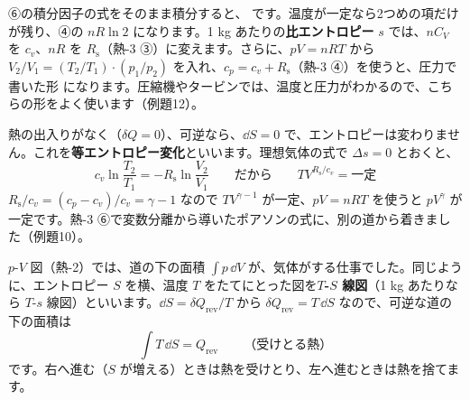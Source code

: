 ⑥の積分因子の式をそのまま積分すると、
です。温度が一定なら2つめの項だけが残り、④の $nR\ln2$ になります。1 kg あたりの\textbf{比エントロピー} $s$ では、$nC_V$ を $c_v$、$nR$ を $R_{\mathrm s}$（熱-3 ③）に変えます。さらに、$pV=nRT$ から $V_2/V_1=(T_2/T_1)\cdot(p_1/p_2)$ を入れ、$c_p=c_v+R_{\mathrm s}$（熱-3 ④）を使うと、圧力で書いた形
になります。圧縮機やタービンでは、温度と圧力がわかるので、こちらの形をよく使います（例題12）。

熱の出入りがなく（$\delta Q=0$）、可逆なら、$\dd S=0$ で、エントロピーは変わりません。これを\textbf{等エントロピー変化}といいます。理想気体の式で $\Delta s=0$ とおくと、
\[c_v\ln\frac{T_2}{T_1}=-R_{\mathrm s}\ln\frac{V_2}{V_1}\qquad\text{だから}\qquad TV^{R_{\mathrm s}/c_v}=\text{一定}\]
$R_{\mathrm s}/c_v=(c_p-c_v)/c_v=\gamma-1$ なので $TV^{\gamma-1}$ が一定、$pV=nRT$ を使うと $pV^{\gamma}$ が一定です。熱-3 ⑥で変数分離から導いたポアソンの式に、別の道から着きました（例題10）。

\begin{phflow}[エントロピーの式]
\end{phflow}

\label{ph:熱-6:sec8}
$p$-$V$ 図（熱-2）では、道の下の面積 $\int p\,\dd V$ が、気体がする仕事でした。同じように、エントロピー $S$ を横、温度 $T$ をたてにとった図を\textbf{$T$-$S$ 線図}（1 kg あたりなら $T$-$s$ 線図）といいます。$\dd S=\delta Q_{\mathrm{rev}}/T$ から $\delta Q_{\mathrm{rev}}=T\,\dd S$ なので、可逆な道の下の面積は
\[\int T\,\dd S=Q_{\mathrm{rev}}\qquad\text{（受けとる熱）}\]
です。右へ進む（$S$ が増える）ときは熱を受けとり、左へ進むときは熱を捨てます。

